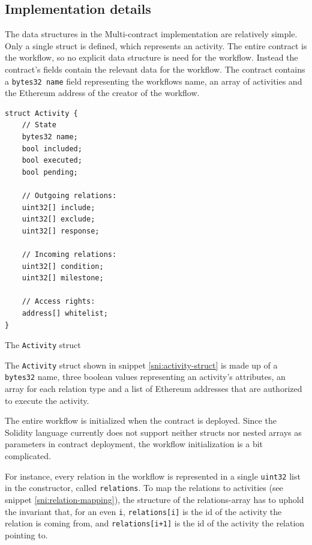 \documentclass{article}
\begin{document}

		\subsection{Implementation details}
		The data structures in the Multi-contract implementation are relatively simple.
		Only a single struct is defined, which represents an activity.
		The entire contract is the workflow, so no explicit data structure is need for the workflow. 
		Instead the contract's fields contain the relevant data for the workflow.
		The contract contains a \texttt{bytes32 name} field representing the workflows name, an array of activities and the Ethereum address of the creator of the workflow.
		\begin{snippet}[!ht]
			\centering
			\begin{lstlisting}[language=solidity, numbers=none]
struct Activity {
    // State
    bytes32 name;
    bool included;
    bool executed;
    bool pending;

    // Outgoing relations:
    uint32[] include;
    uint32[] exclude;
    uint32[] response;
    
    // Incoming relations:
    uint32[] condition;
    uint32[] milestone;

    // Access rights:
    address[] whitelist;
}				
			\end{lstlisting}
		 	\caption[The \texttt{Activity} struct]
		 	{The \texttt{Activity} struct}
		 	\label{sni:activity-struct}
		\end{snippet}
		The \texttt{Activity} struct shown in snippet \ref{sni:activity-struct} is made up of a \texttt{bytes32} name, three boolean values representing an activity's attributes, an array for each relation type and a list of Ethereum addresses that are authorized to execute the activity.

		The entire workflow is initialized when the contract is deployed.
		Since the Solidity language currently does not support neither structs nor nested arrays as parameters in contract deployment, the workflow initialization is a bit complicated. 

		For instance, every relation in the workflow is represented in a single \texttt{uint32} list in the constructor, called \texttt{relations}. 
		To map the relations to activities (see snippet \ref{sni:relation-mapping}), the structure of the relations-array has to uphold the invariant that, for an even \texttt{i}, \texttt{relations[i]} is the id of the activity the relation is coming from, and \texttt{relations[i+1]} is the id of the activity the relation pointing to.
\end{document}
